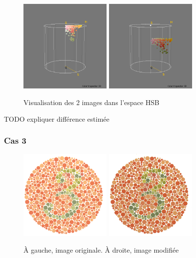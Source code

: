 \documentclass[a4paper]{article}
\begin{document}
\begin{figure}[H]
\begin{center}
\includegraphics[width=170px]{../resultats/e1_q1_k2_7.png}
\includegraphics[width=170px]{../resultats/e1_q1_k2_lumi.png}
\end{center}
\caption{Visualisation des 2 images dans l'espace HSB}
\end{figure}

TODO expliquer différence estimée

\clearpage
\subsubsection{Cas 3}

\begin{figure}[H]
\begin{center}
\includegraphics[width=170px]{../base/cas_3_dalton3.png}
\includegraphics[width=170px]{../base/cas_3_luminance.png}
\end{center}
\caption{À gauche, image originale. À droite, image modifiée}
\end{figure}
\end{document}
